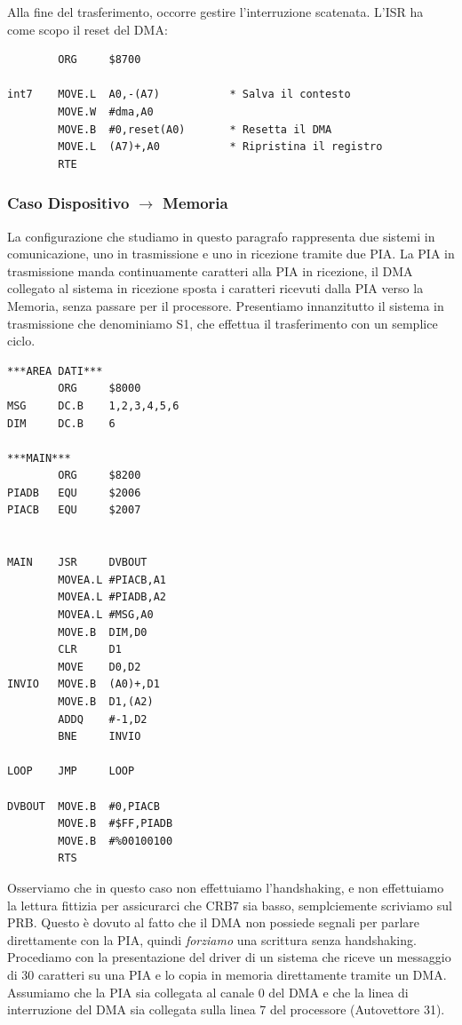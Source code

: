 Alla fine del trasferimento, occorre gestire l'interruzione scatenata. L'ISR ha come scopo il reset del DMA:

\begin{lstlisting}
        ORG     $8700

int7    MOVE.L  A0,-(A7)           * Salva il contesto
        MOVE.W  #dma,A0
        MOVE.B  #0,reset(A0)       * Resetta il DMA
        MOVE.L  (A7)+,A0           * Ripristina il registro
        RTE
\end{lstlisting}

\subsubsection{Caso Dispositivo $\rightarrow$ Memoria}
La configurazione che studiamo in questo paragrafo rappresenta due sistemi in comunicazione, uno in trasmissione e uno in ricezione tramite due PIA. La PIA in trasmissione manda continuamente caratteri alla PIA in ricezione, il DMA collegato al sistema in ricezione sposta i caratteri ricevuti dalla PIA verso la Memoria, senza passare per il processore. 
Presentiamo innanzitutto il sistema in trasmissione che denominiamo S1, che effettua il trasferimento con un semplice ciclo.

\begin{lstlisting}
***AREA DATI***
        ORG     $8000
MSG     DC.B    1,2,3,4,5,6
DIM     DC.B    6

***MAIN***
        ORG     $8200
PIADB   EQU     $2006
PIACB   EQU     $2007 


MAIN    JSR     DVBOUT 
        MOVEA.L #PIACB,A1 
        MOVEA.L #PIADB,A2 
        MOVEA.L #MSG,A0 
        MOVE.B  DIM,D0
        CLR     D1
        MOVE    D0,D2 
INVIO   MOVE.B  (A0)+,D1 
        MOVE.B  D1,(A2) 
        ADDQ    #-1,D2
        BNE     INVIO 

LOOP    JMP     LOOP 

DVBOUT  MOVE.B  #0,PIACB
        MOVE.B  #$FF,PIADB 
        MOVE.B  #%00100100
        RTS 
\end{lstlisting}

Osserviamo che in questo caso non effettuiamo l'handshaking, e non effettuiamo la lettura fittizia per assicurarci che CRB7 sia basso, semplciemente scriviamo sul PRB. Questo è dovuto al fatto che il DMA non possiede segnali per parlare direttamente con la PIA, quindi \textit{forziamo} una scrittura senza handshaking.
Procediamo con la presentazione del driver di un sistema che riceve un messaggio di 30 caratteri su una PIA e lo copia in memoria direttamente tramite un DMA. Assumiamo che la PIA sia collegata al canale 0 del DMA e che la linea di interruzione del DMA sia collegata sulla linea 7 del processore (Autovettore 31).

